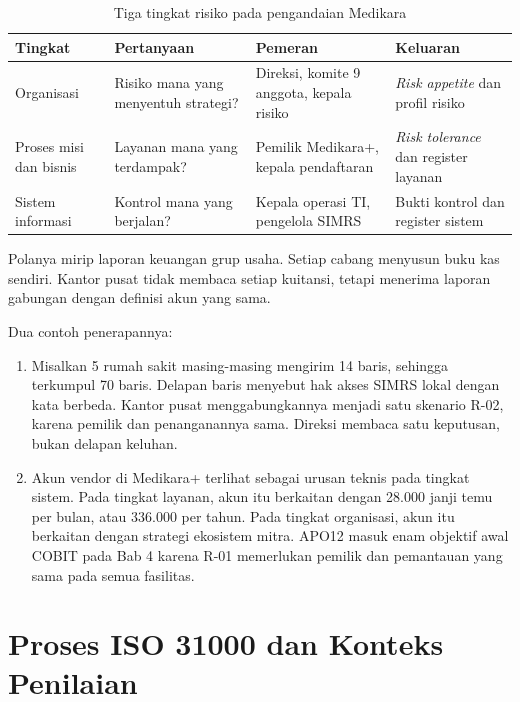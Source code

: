 \begin{table}[!htb]
  \centering\small
  \caption{Tiga tingkat risiko pada pengandaian Medikara}\label{tab:ch05-tingkat}
  \begin{tabularx}{\textwidth}{|>{\raggedright\arraybackslash}p{}|>{\raggedright\arraybackslash}X|>{\raggedright\arraybackslash}p{}|>{\raggedright\arraybackslash}X|}
    \hline
    \textbf{Tingkat} & \textbf{Pertanyaan} & \textbf{Pemeran} & \textbf{Keluaran} \\ \hline
    Organisasi & Risiko mana yang menyentuh strategi? & Direksi, komite 9 anggota, kepala risiko &
    \textit{Risk appetite} dan profil risiko \\ \hline
    Proses misi dan bisnis & Layanan mana yang terdampak? & Pemilik Medikara+, kepala pendaftaran &
    \textit{Risk tolerance} dan register layanan \\ \hline
    Sistem informasi & Kontrol mana yang berjalan? & Kepala operasi TI, pengelola SIMRS & Bukti
    kontrol dan register sistem \\ \hline
  \end{tabularx}
\end{table}

Polanya mirip laporan keuangan grup usaha. Setiap cabang menyusun buku kas sendiri. Kantor pusat
tidak membaca setiap kuitansi, tetapi menerima laporan gabungan dengan definisi akun yang sama.

Dua contoh penerapannya:
\begin{enumerate}
  \item Misalkan 5 rumah sakit masing-masing mengirim 14 baris, sehingga terkumpul 70 baris. Delapan
  baris menyebut hak akses SIMRS lokal dengan kata berbeda. Kantor pusat menggabungkannya menjadi
  satu skenario R-02, karena pemilik dan penanganannya sama. Direksi membaca satu keputusan, bukan
  delapan keluhan.
  \item Akun vendor di Medikara+ terlihat sebagai urusan teknis pada tingkat sistem. Pada tingkat
  layanan, akun itu berkaitan dengan 28.000 janji temu per bulan, atau 336.000 per tahun. Pada
  tingkat organisasi, akun itu berkaitan dengan strategi ekosistem mitra. APO12 masuk enam objektif
  awal COBIT pada Bab 4 karena R-01 memerlukan pemilik dan pemantauan yang sama pada semua fasilitas.
\end{enumerate}

\section{Proses ISO 31000 dan Konteks Penilaian}


